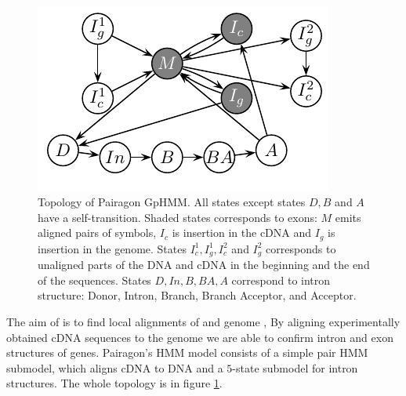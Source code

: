 \paragraph{}

\begin{figure}
\begin{center}
\includegraphics{../figures/pairagon.pdf}
\end{center}
\caption[Topology of Pairagon generalized pair hidden Markov model.]{
Topology of Pairagon GpHMM. All states except states
$D,B$ and $A$ have a self-transition.
Shaded states corresponds to exons: $M$ emits
aligned pairs of symbols, $I_c$ is insertion in the cDNA and $I_g$ is
insertion in the genome. States $I^1_c,I^1_g,I^2_c$ and $I^2_g$ corresponds to
unaligned parts of the DNA and cDNA in the beginning and the end of the
sequences. States $D, In, B, BA, A$ correspond to intron structure:
Donor, Intron, Branch, Branch Acceptor, and Acceptor.
}\label{FIGURE:PAIRAGON}
\end{figure}


The aim of  is to find local alignments of  and genome \cite{Pairagon2009}, By aligning experimentally obtained
cDNA sequences to the genome we are able to confirm intron and exon structures
of genes.  Pairagon's HMM model consists of a simple pair HMM submodel, which
aligns cDNA to DNA and a $5$-state submodel for intron structures. The whole
topology is in figure \ref{FIGURE:PAIRAGON}. 

